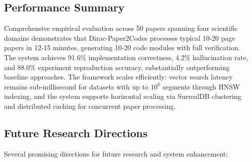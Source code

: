 \documentclass{ieeeaccess}
\begin{document}
\subsection{Performance Summary}
Comprehensive empirical evaluation across 50 papers spanning four scientific domains demonstrates that Dirac-Paper2Codes processes typical 10-20 page papers in 12-15 minutes, generating 10-20 code modules with full verification. The system achieves 91.6\% implementation correctness, 4.2\% hallucination rate, and 88.0\% experiment reproduction accuracy, substantially outperforming baseline approaches. The framework scales efficiently: vector search latency remains sub-millisecond for datasets with up to \(10^6\) segments through HNSW indexing, and the system supports horizontal scaling via SurrealDB clustering and distributed caching for concurrent paper processing.

\subsection{Future Research Directions}
Several promising directions for future research and system enhancement:
\end{document}
